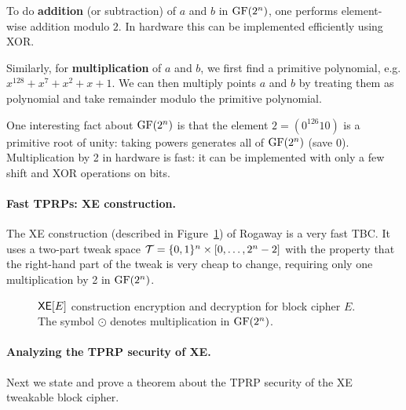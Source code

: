 To do \textbf{addition} (or subtraction) of $a$ and $b$ in $\text{GF}(2^n)$, one performs element-wise addition modulo $2$. In hardware this can be implemented efficiently using XOR.

Similarly, for \textbf{multiplication} of $a$ and $b$, we first find a primitive polynomial, e.g. $x^{128} + x^{7} + x^2 + x + 1$.
We can then multiply points $a$ and $b$ by treating them as polynomial and take remainder modulo the primitive polynomial.

One interesting fact about $\text{GF}(2^{n})$ is that the element $2=(0^{126}10)$ is a primitive root of unity: taking powers generates all of $\text{GF}(2^{n})$ (save 0). Multiplication by 2 in hardware is fast: it can be implemented with only a few shift and XOR operations on bits. 

\paragraph{Fast TPRPs: XE construction.} The XE construction (described in Figure~\ref{fig:xe}) of Rogaway is a very fast TBC. It uses a two-part tweak space $\mathcal{T} = \{0,1\}^{n}\times [0, \ldots, 2^{n}-2]$ with the property that the right-hand part of the tweak is very cheap to change, requiring only one multiplication by 2 in $\text{GF}(2^{n})$.

\begin{figure}[h]
  \centering
  \caption{$\mathsf{XE}[E]$ construction encryption and decryption for block cipher $E$. The symbol $\odot$ denotes multiplication in $\text{GF}(2^{n})$.}
  \label{fig:xe}
\end{figure}


\paragraph{Analyzing the TPRP security of XE.} Next we state and prove a theorem about the TPRP security of the XE tweakable block cipher.


